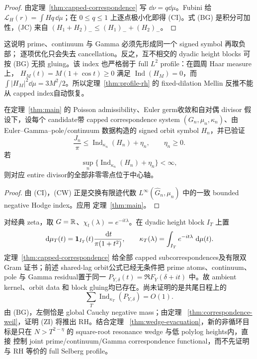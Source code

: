 \begin{proof}
由定理~\ref{thm:capped-correspondence} 写 $\dd\nu=q\dd\mu$。Fubini 给
$\mathcal L_H(r)=\int Hq\,\dd\mu$；在 $0\leq q\leq1$ 上逐点极小化即得
(CI)。式 (BG) 是积分可加性，(JC) 来自
$(H_1+H_2)_-\leq(H_1)_-+(H_2)_-$。
\end{proof}

这说明 prime、continuum 与 Gamma 必须先形成同一个 signed symbol 再取负部；
逐项优化只会失去 cancellation。反之，互不相交的 dyadic height blocks 可按 (BG)
无损 gluing。该 index 也严格弱于 full $L^2$ profile：在圆周 Haar measure上，
$H_M(t)=M(1+\cos t)\geq0$ 满足
$\operatorname{Ind}(H_M)=0$，而
$\int|H_M|^2\dd\mu=3M^2/2$。所以定理~\ref{thm:profile-rh} 的 fixed-dilation
Mellin 反推不能从 capped index自动恢复。

\begin{theorem}
\label{thm:correspondence-weil}
在定理~\ref{thm:main} 的 Poisson admissibility、Euler germ收敛和自对偶 divisor
假设下，设每个 candidate带 capped correspondence system
$(G_n,\mu_n,\kappa_n)$、由 Euler--Gamma--pole/continuum 数据构造的 signed
orbit symbol $H_n$，并已验证
\[
 \frac{J_n}{\pi}\leq
 \operatorname{Ind}_{\kappa_n}(H_n)+\eta_n,\qquad \eta_n\geq0.
\]
若
\[
 \sup_n\{\operatorname{Ind}_{\kappa_n}(H_n)+\eta_n\}<\infty,
 \tag{CW}
\]
则对应 entire divisor的全部非零零点位于中心轴。
\end{theorem}

\begin{proof}
由 (CI)，(CW) 正是交换有限迹代数
$L^\infty(\widehat G_n,\mu_n)$ 中的一致 bounded negative Hodge index。应用
定理~\ref{thm:main}。
\end{proof}

对经典 zeta，取 $G=\mathbb R$、$\chi_t(\lambda)=e^{-it\lambda}$。在 dyadic height
block $I_T$ 上置
\[
 \,\mathrm d\mu_T(t)=\mathbf 1_{I_T}(t)\frac{\,\mathrm d t}{\pi(1+t^2)},\qquad
 \kappa_T(\lambda)=\int_{I_T}e^{-it\lambda}\,\,\mathrm d\mu(t).
\]
定理~\ref{thm:capped-correspondence} 给全部 capped subcorrespondences及有限双
Gram 证书；前述 shared-lag orbit公式已经无条件把 prime atoms、continuum、pole
与 Gamma residual置于同一 $P_{Y,\delta}(t)=\Re F_Y(\delta+it)$ 中。故 ambient
kernel、orbit data 和 block gluing均已存在。尚未证明的是共尾日程上的
\[
 \sum_T\operatorname{Ind}_{\kappa_T}(P_{Y,\delta})=O(1). \tag{ZI}
\]
由 (BG)，左侧恰是 global Cauchy negative mass；由定理
~\ref{thm:correspondence-weil}，证明 (ZI) 将推出 RH。结合定理
~\ref{thm:wedge-evacuation}，新的非循环目标是只在
$N>T^{2-\eta}$ 的 square-root resonance wedge 与低 polylog heights内，直接
控制 joint prime/continuum/Gamma correspondence functional，而不先证明与 RH
等价的 full Selberg profile。
